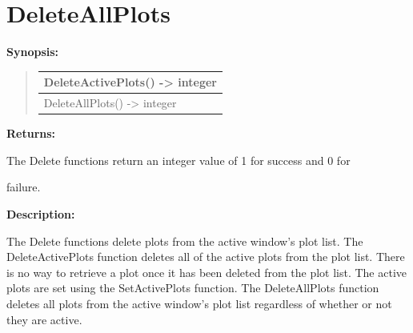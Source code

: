 \documentclass[letterpaper,10pt,english]{sphinxmanual}
\begin{document}
\section{DeleteAllPlots}
\label{functions:deleteallplots}
\begin{DUlineblock}{0em}
\item[] \textbf{Synopsis:}
\end{DUlineblock}
\begin{quote}

\begin{tabulary}{\linewidth}{|L|}
\hline

DeleteActivePlots() -\textgreater{} integer
\\
\hline
DeleteAllPlots() -\textgreater{} integer
\\
\hline\end{tabulary}

\end{quote}

\begin{DUlineblock}{0em}
\item[] 
\item[] \textbf{Returns:}
\item[] The Delete functions return an integer value of 1 for success and 0 for
\item[] failure.
\item[] 
\item[] \textbf{Description:}
\item[] The Delete functions delete plots from the active window's plot list. The
DeleteActivePlots function deletes all of the active plots from the plot
list. There is no way to retrieve a plot once it has been deleted from the
plot list. The active plots are set using the SetActivePlots function. The
DeleteAllPlots function deletes all plots from the active window's plot
list regardless of whether or not they are active.
\end{DUlineblock}

\begin{DUlineblock}{0em}
\item[] 
\end{DUlineblock}
\end{document}
